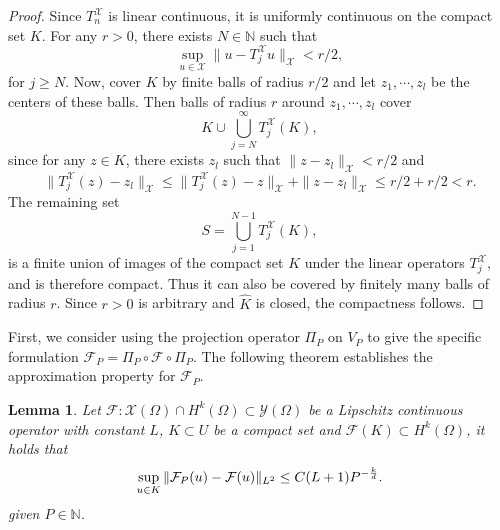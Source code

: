 \documentclass[preprint,12pt]{elsarticle}
\theoremstyle{plain}
\newtheorem{lemma}[theorem]{Lemma}
\numberwithin{figure}{section}
\numberwithin{table}{section}
\begin{document}
\begin{proof}
	Since  $T^\mathcal{X}_n$ is linear continuous, it is uniformly continuous on the compact set $K$. For any $r>0$, there exists ${N}\in\mathbb{N}$ such that 
	$$
	\sup_{u\in \mathcal{X}}\|u-T^\mathcal{X}_ju\|_\mathcal{X}<r/2,
	$$
	for $j\ge {N}$. Now, cover $K$ by finite balls of radius $r/2$ and let $z_1,\cdots,z_l$ be the centers of these balls. Then balls of radius $r$ around $z_1,\cdots,z_l$ cover
	\begin{equation}
		K\cup \bigcup_{j={N}}^\infty {T}^{\mathcal{X}}_j(K),
	\end{equation}
	since for any $z\in K$, there exists $z_l$ such that $\|z-z_l\|_\mathcal{X}<r/2$ and 
	\begin{equation}
		\|T^\mathcal{X}_j(z)-z_l\|_\mathcal{X}\le \|T^\mathcal{X}_j(z)-z\|_\mathcal{X}+\|z-z_l\|_{\mathcal{X}}\le r/2+r/2<r.
	\end{equation}
	The remaining set
	\begin{equation}
		S = \bigcup_{j=1}^{{N}-1}{T}^\mathcal{X}_j(K),
	\end{equation}
	is a finite union of images of the compact set $K$ under the linear operators $T^\mathcal{X}_j$, and is therefore compact. Thus it can also be covered by finitely many balls of radius $r$. Since $r>0$ is arbitrary and $\widehat{K}$ is closed, the compactness follows.
\end{proof}

First, we consider using the projection operator $\Pi_P$ on $V_P$ to give the specific formulation $\mathcal{F}_P = \Pi_P \circ \mathcal{F} \circ \Pi_P$. The following theorem establishes the approximation property for $\mathcal{F}_P$.

\begin{lemma}\label{lem:approxop}
	Let $\mathcal{F}: \mathcal{X}(\Omega)\cap H^k(\Omega)\subset \mathcal{Y}(\Omega)$ be  a Lipschitz continuous operator with constant $L$,  $K\subset U$ be a compact set and $\mathcal{F}(K)\subset H^k(\Omega)$, it holds that
	\begin{equation}
		\sup_{u\in K} \|\mathcal{F}_P(u)-\mathcal{F}(u)\|_{L^2}\le C(L+1)P^{-{k\over d}}.
	\end{equation}
	given $P \in \mathbb{N}$.
\end{lemma}
\end{document}
